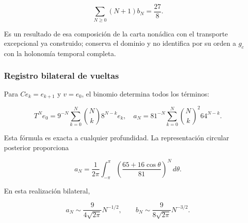 \begin{equation}
\sum_{N\geq0}(N+1)b_N=\frac{27}{8}.
\label{nuc03:eq:17}
\end{equation}

Es un resultado de esa composición de la carta nonádica con el transporte excepcional ya construido; conserva el dominio y no identifica por su orden a \(g_c\) con la holonomía temporal completa.

\subsubsection{Registro bilateral de vueltas}

Para \(C e_k=e_{k+1}\) y \(v=e_0\), el binomio determina todos los términos:

\begin{equation}
T^Ne_0=9^{-N}\sum_{k=0}^{N}\binom{N}{k}8^{N-k}e_k,
\quad
a_N=81^{-N}\sum_{k=0}^{N}\binom{N}{k}^{\!2}64^{N-k}.
\label{nuc03:eq:18}
\end{equation}

Esta fórmula es exacta a cualquier profundidad. La representación circular posterior proporciona

\begin{equation}
a_N=\frac1{2\pi}\int_{-\pi}^{\pi}
\left(\frac{65+16\cos\theta}{81}\right)^N\,d\theta.
\label{nuc03:eq:19}
\end{equation}

\begin{theorem}
En esta realización bilateral,

\begin{equation}
\boxed{a_N\sim\frac9{4\sqrt{2\pi}}N^{-1/2},\qquad
b_N\sim\frac9{8\sqrt{2\pi}}N^{-3/2}.}
\label{nuc03:eq:20}
\end{equation}
\end{theorem}


